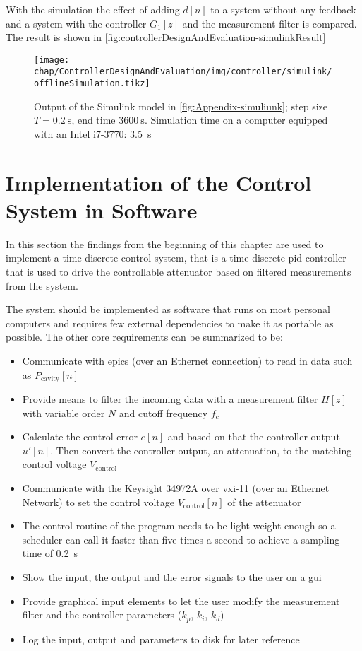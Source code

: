 With the simulation the effect of adding $d[n]$ to a system without any feedback and a system with the controller $G_1[z]$ and the measurement filter is compared. The result is shown in \autoref{fig:controllerDesignAndEvaluation-simulinkResult}

\begin{figure}[tb]
	\centering
	\texttt{[image: chap/ControllerDesignAndEvaluation/img/controller/simulink/offlineSimulation.tikz]}
	\caption{Output of the Simulink model in \autoref{fig:Appendix-simuliunk}; step size $T=\SI{0.2}{\second}$, end time $\SI{3600}{\second}$. Simulation time on a computer equipped with an Intel i7-3770: \SI{3.5}{\second}}
	\label{fig:controllerDesignAndEvaluation-simulinkResult}
\end{figure}







\newpage
\section{Implementation of the Control System in Software}
In this section the findings from the beginning of this chapter are used to implement a time discrete control system, that is a time discrete \gls{pid} controller that is used to drive the controllable attenuator based on filtered measurements from the system.

The system should be implemented as software that runs on most personal computers and requires few external dependencies to make it as portable as possible. The other core requirements can be summarized to be:
\begin{itemize}
\item Communicate with \gls{epics} (over an Ethernet connection) to read in data such as $P_\text{cavity}[n]$
\item Provide means to filter the incoming data with a measurement filter $H[z]$ with variable order $N$ and cutoff frequency $f_c$
\item Calculate the control error $e[n]$ and based on that the controller output $u'[n]$. Then convert the controller output, an attenuation, to the matching control voltage $V_\text{control}$
\item Communicate with the Keysight 34972A over \gls{vxi-11} (over an Ethernet Network) to set the control voltage $V_\text{control}[n]$ of the attenuator
\item The control routine of the program needs to be light-weight enough so a scheduler can call it faster than five times a second to achieve a sampling time of \SI{0.2}{\second}
\item Show the input, the output and the error signals to the user on a \gls{gui}
\item Provide graphical input elements to let the user modify the measurement filter and the controller parameters ($k_p$, $k_i$, $k_d$)
\item Log the input, output and parameters to disk for later reference
\end{itemize}

